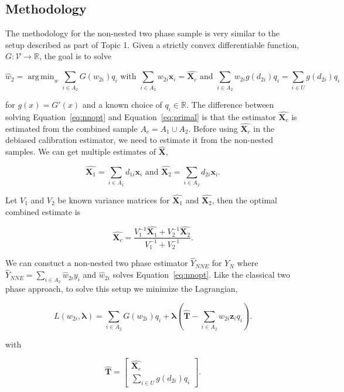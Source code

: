 \documentclass[12pt]{article}
\DeclareMathOperator*{\argmin}{arg\,min}
\renewcommand{\bf}[1]{\mathbf{#1}}
\begin{document}
\subsection{Methodology}

The methodology for the non-nested two phase sample is very similar to the setup
described as part of Topic 1. Given a strictly convex differentiable function,
$G: \mathcal{V} \to \mathbb{R}$, the goal is to solve

\begin{equation}\label{eq:nnopt}
\hat w_2 = \argmin_w \sum_{i \in A_2} G\left(w_{2i}\right) q_i 
\text{ with } 
\sum_{i \in A_2} w_{2i} \bf x_i = \hat{\bf X_{c}} \text{ and } 
\sum_{i \in A_2} w_{2i} g(d_{2i}) q_i = \sum_{i \in U} g(d_{2i}) q_i
\end{equation}

for $g(x) = G'(x)$ and a known choice of $q_i \in \mathbb{R}$. 
The difference
between solving Equation~\ref{eq:nnopt} and Equation~\ref{eq:primal} is that the
estimator $\hat{\bf X_c}$ is estimated from the combined sample $A_c= A_1 \cup
A_2$. Before using $\hat{\bf X_c}$ in the debiased calibration estimator, we
need to estimate it from the non-nested samples. We can get multiple estimates
of $\hat{\bf X}$, 

$$\hat{\bf X_1} = \sum_{i \in A_1} d_{1i} \bf x_i \text{ and }
\hat{\bf X_2} = \sum_{i \in A_2} d_{2i} \bf x_i.$$

Let $V_1$ and $V_2$ be known variance matrices for $\hat{\bf X_1}$ and 
$\hat{\bf X_2}$, then the optimal combined estimate is 

$$\hat{\bf X_c} = \frac{V_1^{-1} \hat{\bf X_1} + V_2^{-1} 
\hat{\bf X_2}}{V_1^{-1} + V_2^{-1}}.$$

We can constuct a non-nested two phase estimator $\hat Y_{NNE}$ for $Y_N$ where
$\hat Y_{NNE} = \sum_{i \in A_2} \hat w_{2i} y_i$ and $\hat w_{2i}$ solves
Equation~\ref{eq:nnopt}. Like the classical two phase approach, to solve this
setup we minimize the Lagrangian,

\begin{equation}\label{eq:legragedc2}
  L(w_{2i}, \bm \lambda) = \sum_{i \in A_2} G(w_{2i}) q_i + 
  \bm \lambda \left( \hat{\bf T} - \sum_{i \in A_2} w_{2i} \bf z_i q_i\right).
\end{equation}

with 

$$\hat{\bf T} = 
\begin{bmatrix}
  \hat{\bf X_c} \\ \sum_{i \in U} g(d_{2i}) q_i
\end{bmatrix}.
$$
\end{document}
